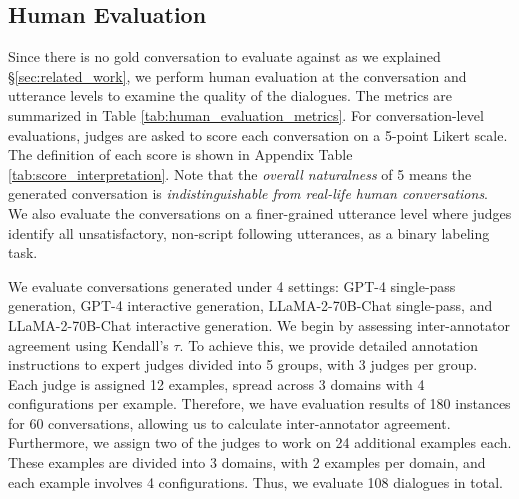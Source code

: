 \subsection{Human Evaluation} 
\label{sec:human_evaluation}
Since there is no gold conversation to evaluate against as we explained \S\ref{sec:related_work}, we perform human evaluation at the conversation and utterance levels to examine the quality of the dialogues.
The metrics are summarized in Table \ref{tab:human_evaluation_metrics}. For conversation-level evaluations, judges are asked to score each conversation on a 5-point Likert scale. The definition of each score is shown in Appendix Table \ref{tab:score_interpretation}. Note that the \textit{overall naturalness} of 5 means the generated conversation is \textit{indistinguishable from real-life human conversations}. %
We also evaluate the conversations on a finer-grained utterance level where judges identify all unsatisfactory, non-script following utterances, as a binary labeling task. 

We evaluate conversations generated under 4 settings: GPT-4 single-pass generation, GPT-4 interactive generation, LLaMA-2-70B-Chat single-pass, and LLaMA-2-70B-Chat interactive generation. We begin by assessing inter-annotator agreement using Kendall's $\tau$. To achieve this, we provide detailed annotation instructions to expert judges divided into 5 groups, with 3 judges per group. Each judge is assigned 12 examples, spread across 3 domains with 4 configurations per example. Therefore, we have evaluation results of 180
instances for 60
conversations, allowing us to calculate inter-annotator agreement. Furthermore, we assign two of the judges to work on 24 additional examples each. These examples are divided into 3 domains, with 2 examples per domain, and each example involves 4 configurations. Thus, we evaluate 
108 dialogues in total. %

